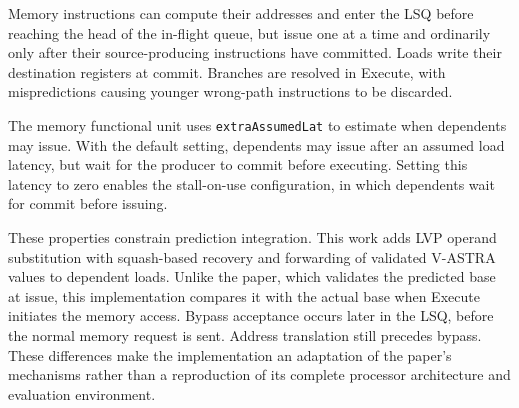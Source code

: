 Memory instructions can compute their addresses and enter the LSQ
before reaching the head of the in-flight queue, but issue one at a
time and ordinarily only after their source-producing instructions
have committed. Loads write their destination registers at commit.
Branches are resolved in Execute, with mispredictions causing
younger wrong-path instructions to be discarded.

The memory functional unit uses \texttt{extraAssumedLat} to estimate
when dependents may issue. With the default setting, dependents may
issue after an assumed load latency, but wait for the producer to
commit before executing. Setting this latency to zero enables the
stall-on-use configuration, in which dependents wait for commit
before issuing.

These properties constrain prediction integration. This work adds
LVP operand substitution with squash-based recovery and forwarding
of validated V-ASTRA values to dependent loads. Unlike the paper,
which validates the predicted base at issue, this implementation
compares it with the actual base when Execute initiates the memory
access. Bypass acceptance occurs later in the LSQ, before the normal
memory request is sent. Address translation still precedes bypass.
These differences make the implementation an adaptation of the
paper's mechanisms rather than a reproduction of its complete
processor architecture and evaluation environment.

